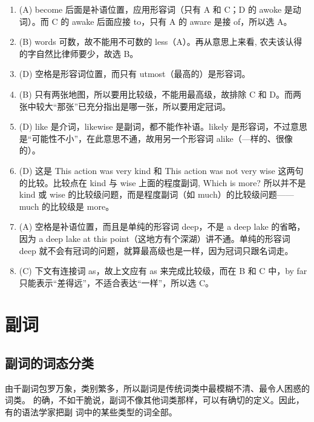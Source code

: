 \begin{enumerate}
\item (A) become 后面是补语位置，应用形容词（只有 A 和 C；D 的 awoke 是动词）。而 C 的 awake 后面应接 to，只有 A 的 aware 是接 of，所以选 A。
\item (B) words 可数，故不能用不可数的 less（A）。再从意思上来看, 农夫该认得的字自然比律师要少，故选 B。

\item  (D) 空格是形容词位置，而只有 utmost（最高的）是形容词。

\item  (B) 只有两张地图，所以要用比较级，不能用最高级，故排除 C 和 D。而两张中较大“那张”已充分指出是哪一张，所以要用定冠词。

\item  (D) like 是介词，likewise 是副词，都不能作补语。likely 是形容词，不过意思是“可能性不小”，在此意思不通，故用另一个形容词 alike（—样的、很像的）。

\item (D) 这是 This action was very kind 和 This action was not very wise 这两句的比较。比较点在 kind 与 wise 上面的程度副词, Which is more? 所以并不是 kind 或 wise 的比较级问题，而是程度副词（如 much）的比较级问题——much 的比较级是 more。

\item (A) 空格是补语位置，而且是单纯的形容词 deep，不是 a deep lake 的省略，因为 a deep lake at this point（这地方有个深湖）讲不通。单纯的形容词 deep 就不会有冠词的问题，就算最高级也是一样，因为冠词只跟名词走。

\item (C) 下文有连接词 as，故上文应有 as 来完成比较级，而在 B 和 C 中，by far 只能表示“差得远”，不适合表达“一样”，所以选 C。
\end{enumerate}

\chapter{副词}


\section{副词的词态分类}

由千副词包罗万象，类别繁多，所以副词是传统词类中最模糊不清、最令人困惑的词类。
的确，不如干脆说，副词不像其他词类那样，可以有确切的定义。因此，有的语法学家把副
词中的某些类型的词全部。

